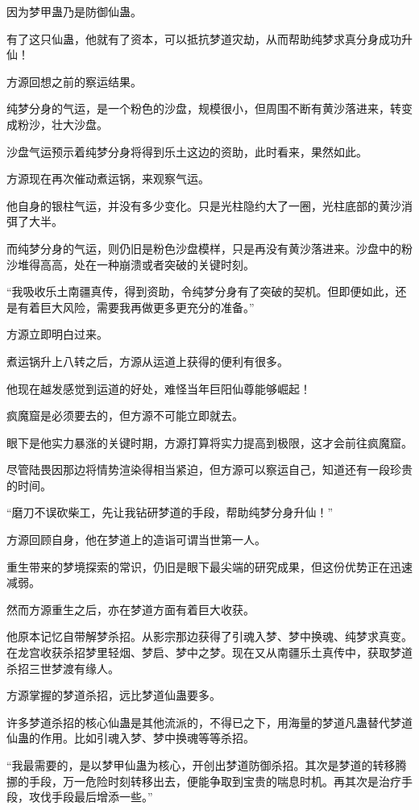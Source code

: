 \begin{this_body}
因为梦甲蛊乃是防御仙蛊。

有了这只仙蛊，他就有了资本，可以抵抗梦道灾劫，从而帮助纯梦求真分身成功升仙！

方源回想之前的察运结果。

纯梦分身的气运，是一个粉色的沙盘，规模很小，但周围不断有黄沙落进来，转变成粉沙，壮大沙盘。

沙盘气运预示着纯梦分身将得到乐土这边的资助，此时看来，果然如此。

方源现在再次催动煮运锅，来观察气运。

他自身的银柱气运，并没有多少变化。只是光柱隐约大了一圈，光柱底部的黄沙消弭了大半。

而纯梦分身的气运，则仍旧是粉色沙盘模样，只是再没有黄沙落进来。沙盘中的粉沙堆得高高，处在一种崩溃或者突破的关键时刻。

“我吸收乐土南疆真传，得到资助，令纯梦分身有了突破的契机。但即便如此，还是有着巨大风险，需要我再做更多更充分的准备。”

方源立即明白过来。

煮运锅升上八转之后，方源从运道上获得的便利有很多。

他现在越发感觉到运道的好处，难怪当年巨阳仙尊能够崛起！

疯魔窟是必须要去的，但方源不可能立即就去。

眼下是他实力暴涨的关键时期，方源打算将实力提高到极限，这才会前往疯魔窟。

尽管陆畏因那边将情势渲染得相当紧迫，但方源可以察运自己，知道还有一段珍贵的时间。

“磨刀不误砍柴工，先让我钻研梦道的手段，帮助纯梦分身升仙！”

方源回顾自身，他在梦道上的造诣可谓当世第一人。

重生带来的梦境探索的常识，仍旧是眼下最尖端的研究成果，但这份优势正在迅速减弱。

然而方源重生之后，亦在梦道方面有着巨大收获。

他原本记忆自带解梦杀招。从影宗那边获得了引魂入梦、梦中换魂、纯梦求真变。在龙宫收获杀招梦里轻烟、梦启、梦中之梦。现在又从南疆乐土真传中，获取梦道杀招三世梦渡有缘人。

方源掌握的梦道杀招，远比梦道仙蛊要多。

许多梦道杀招的核心仙蛊是其他流派的，不得已之下，用海量的梦道凡蛊替代梦道仙蛊的作用。比如引魂入梦、梦中换魂等等杀招。

“我最需要的，是以梦甲仙蛊为核心，开创出梦道防御杀招。其次是梦道的转移腾挪的手段，万一危险时刻转移出去，便能争取到宝贵的喘息时机。再其次是治疗手段，攻伐手段最后增添一些。”


\end{this_body}
